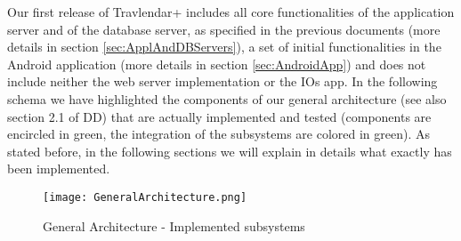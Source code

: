 Our first release of Travlendar+ includes all core functionalities of the application server and of the database server, as specified in the previous documents (more details in section \ref{sec:ApplAndDBServers}), a set of initial functionalities in the Android application (more details in section \ref{sec:AndroidApp}) and does not include neither the web server implementation or the IOs app.
In the following schema we have highlighted the components of our general architecture (see also section 2.1 of DD) that are actually implemented and tested (components are encircled in green, the integration of the subsystems are colored in green). As stated before, in the following sections we will explain in details what exactly has been implemented.
\begin{figure}[H]
	\begin{center}
		\hspace*{-40pt}
		\texttt{[image: GeneralArchitecture.png]}
	\end{center}
\caption{General Architecture - Implemented subsystems}
\end{figure}

\newpage

